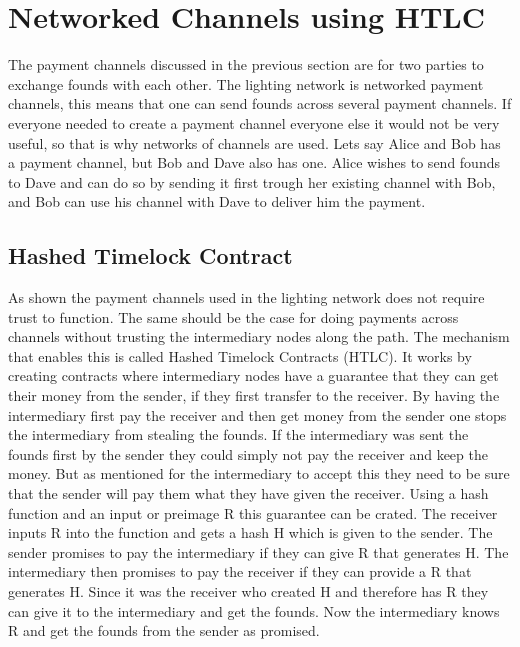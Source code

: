 \documentclass[informationsecurity]{gucmasterproject}
\begin{document}
\chapter{Networked Channels using HTLC}

The payment channels discussed in the previous section are for two parties to exchange founds with each other.
The lighting network is networked payment channels, this means that one can send founds across several payment channels. If everyone needed to create a payment channel everyone else it would not be very useful, so that is why networks of channels are used. Lets say Alice and Bob has a payment channel, but Bob and Dave also has one. Alice wishes to send founds to Dave and can do so by sending it first trough her existing channel with Bob, and Bob can use his channel with Dave to deliver him the payment.

\section{Hashed Timelock Contract}

As shown the payment channels used in the lighting network does not require trust to function. The same should be the case for doing payments across channels without trusting the intermediary nodes along the path. The mechanism that enables this is called Hashed Timelock Contracts (HTLC).
It works by creating contracts where intermediary nodes have a guarantee that they can get their money from the sender, if they first transfer to the receiver. By having the intermediary first pay the receiver and then get money from the sender one stops the intermediary from stealing the founds. If the intermediary was sent the founds first by the sender they could simply not pay the receiver and keep the money. But as mentioned for the intermediary to accept this they need to be sure that the sender will pay them what they have given the receiver. Using a hash function and an input or preimage R this guarantee can be crated. The receiver inputs R into the function and gets a hash H which is given to the sender. The sender promises to pay the intermediary if they can give R that generates H. The intermediary then promises to pay the receiver if they can provide a R that generates H. Since it was the receiver who created H and therefore has R they can give it to the intermediary and get the founds. Now the intermediary knows R and get the founds from the sender as promised.
\end{document}
